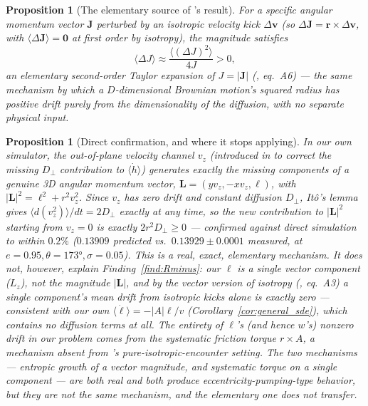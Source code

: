 \documentclass[12pt]{amsart}
\theoremstyle{plain}
\newtheorem{proposition}[theorem]{Proposition}
\theoremstyle{remark}
\begin{document}
\begin{proposition}[The elementary source of \cite{HamiltonModak2024}'s result]\label{prop:HM}
For a specific angular momentum vector $\mathbf{J}$ perturbed by an isotropic velocity kick $\Delta\mathbf{v}$ (so $\Delta\mathbf{J}=\mathbf{r}\times\Delta\mathbf{v}$, with $\langle\Delta\mathbf{J}\rangle=\mathbf{0}$ at first order by isotropy), the magnitude satisfies
\begin{equation}
\langle\Delta J\rangle \approx \frac{\langle(\Delta J)^2\rangle}{4J} > 0, \tag{6}
\end{equation}
an elementary second-order Taylor expansion of $J=|\mathbf{J}|$ (\cite{HamiltonModak2024}, eq.~A6) --- the same mechanism by which a $D$-dimensional Brownian motion's squared radius has positive drift purely from the dimensionality of the diffusion, with no separate physical input.
\end{proposition}

\begin{proposition}[Direct confirmation, and where it stops applying]\label{prop:HMcheck}
In our own simulator, the out-of-plane velocity channel $v_z$ (introduced in \cite{Ebert2026MonteCarloNote} to correct the missing $D_\perp$ contribution to $\langle\dot h\rangle$) generates exactly the missing components of a genuine 3D angular momentum vector, $\mathbf{L}=(yv_z,-xv_z,\ell)$, with $|\mathbf{L}|^2=\ell^2+r^2v_z^2$. Since $v_z$ has zero drift and constant diffusion $D_\perp$, It\^o's lemma gives $\langle d(v_z^2)\rangle/dt=2D_\perp$ exactly at any time, so the new contribution to $|\mathbf{L}|^2$ starting from $v_z=0$ is exactly $2r^2D_\perp\geq0$ --- confirmed against direct simulation to within $0.2\%$ ($0.13909$ predicted vs.\ $0.13929\pm0.0001$ measured, at $e=0.95,\theta=173°,\sigma=0.05$). This is a real, exact, elementary mechanism. It does not, however, explain Finding~\ref{find:Rminus}: our $\ell$ is a single vector component ($L_z$), not the magnitude $|\mathbf{L}|$, and by the vector version of isotropy (\cite{HamiltonModak2024}, eq.~A3) a single component's mean drift from isotropic kicks alone is exactly zero --- consistent with our own $\langle\dot\ell\rangle=-|A|\ell/v$ (Corollary~\ref{cor:general_sde}), which contains no diffusion terms at all. The entirety of $\ell$'s (and hence $w$'s) nonzero drift in our problem comes from the systematic friction torque $r\times A$, a mechanism absent from \cite{HamiltonModak2024}'s pure-isotropic-encounter setting. The two mechanisms --- entropic growth of a vector magnitude, and systematic torque on a single component --- are both real and both produce eccentricity-pumping-type behavior, but they are not the same mechanism, and the elementary one does not transfer.
\end{proposition}
\end{document}
